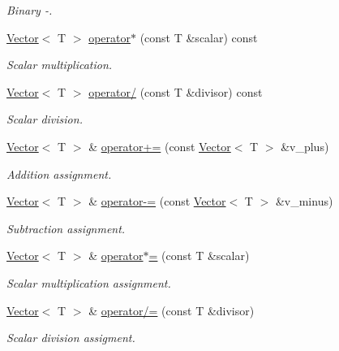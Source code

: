 \begin{DoxyCompactItemize}
\begin{DoxyCompactList}\small\item\em Binary -\/. \end{DoxyCompactList}\item 
\hyperlink{classLuna_1_1Vector}{Vector}$<$ T $>$ \hyperlink{classLuna_1_1Vector_a2d6abef72879a5ef40ce068271eb145f}{operator$\ast$} (const T \&scalar) const
\begin{DoxyCompactList}\small\item\em Scalar multiplication. \end{DoxyCompactList}\item 
\hyperlink{classLuna_1_1Vector}{Vector}$<$ T $>$ \hyperlink{classLuna_1_1Vector_aabb416e2f6237ad98c24c7059fc742eb}{operator/} (const T \&divisor) const
\begin{DoxyCompactList}\small\item\em Scalar division. \end{DoxyCompactList}\item 
\hyperlink{classLuna_1_1Vector}{Vector}$<$ T $>$ \& \hyperlink{classLuna_1_1Vector_a80a9509a146aeab507f93f994fd7eff9}{operator+=} (const \hyperlink{classLuna_1_1Vector}{Vector}$<$ T $>$ \&v\+\_\+plus)
\begin{DoxyCompactList}\small\item\em Addition assignment. \end{DoxyCompactList}\item 
\hyperlink{classLuna_1_1Vector}{Vector}$<$ T $>$ \& \hyperlink{classLuna_1_1Vector_a1be4f350f70c6bd70032da8d5a2329ef}{operator-\/=} (const \hyperlink{classLuna_1_1Vector}{Vector}$<$ T $>$ \&v\+\_\+minus)
\begin{DoxyCompactList}\small\item\em Subtraction assignment. \end{DoxyCompactList}\item 
\hyperlink{classLuna_1_1Vector}{Vector}$<$ T $>$ \& \hyperlink{classLuna_1_1Vector_aad04978d7a710d8091bbbb0497173547}{operator$\ast$=} (const T \&scalar)
\begin{DoxyCompactList}\small\item\em Scalar multiplication assignment. \end{DoxyCompactList}\item 
\hyperlink{classLuna_1_1Vector}{Vector}$<$ T $>$ \& \hyperlink{classLuna_1_1Vector_a27dfb8d1b326a6bc7fd482fecb922f64}{operator/=} (const T \&divisor)
\begin{DoxyCompactList}\small\item\em Scalar division assigment. \end{DoxyCompactList}\item 

\end{DoxyCompactItemize}

